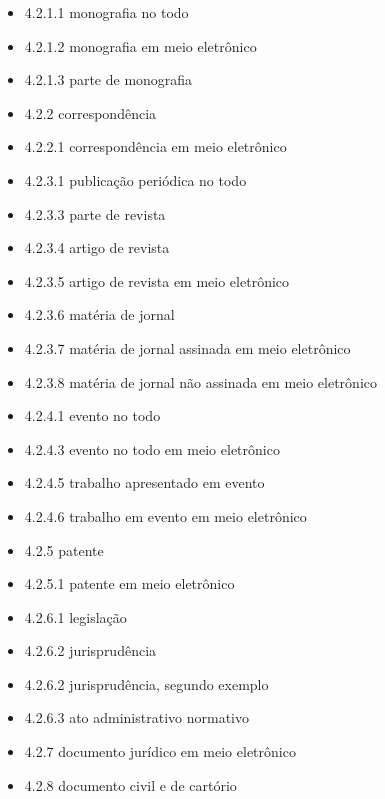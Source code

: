 \documentclass[dsc,pdfa,coorientador,dadoscoleta]{ufrj}
\begin{document}
  \begin{itemize}
    \item 4.2.1.1 monografia no todo \citep{m-4211,pt-4211}
    \item 4.2.1.2 monografia em meio eletrônico \citep{m-4212,pt-4212}
    \item 4.2.1.3 parte de monografia \citep{m-4213,pt-4213}
    \item 4.2.2 correspondência \citep{m-422,pt-422}
    \item 4.2.2.1 correspondência em meio eletrônico \citep{m-4221,pt-4221}
    \item 4.2.3.1 publicação periódica no todo \citep{m-4231,pt-4231}
    \item 4.2.3.3 parte de revista \citep{m-4233,pt-4233}
    \item 4.2.3.4 artigo de revista \citep{m-4234,pt-4234}
    \item 4.2.3.5 artigo de revista em meio eletrônico \citep{m-4235,pt-4235}
    \item 4.2.3.6 matéria de jornal \citep{m-4236,pt-4236}
    \item 4.2.3.7 matéria de jornal assinada em meio eletrônico \citep{m-4237,pt-4237}
    \item 4.2.3.8 matéria de jornal não assinada em meio eletrônico \citep{m-4238,pt-4238}
    \item 4.2.4.1 evento no todo \citep{m-4241,pt-4241}
    \item 4.2.4.3 evento no todo em meio eletrônico \citep{m-4243,pt-4243}
    \item 4.2.4.5 trabalho apresentado em evento \citep{m-4245,pt-4245}
    \item 4.2.4.6 trabalho em evento em meio eletrônico \citep{m-4246,pt-4246}
    \item 4.2.5 patente \citep{m-425,pt-425}
    \item 4.2.5.1 patente em meio eletrônico \citep{m-4251,pt-4251}
    \item 4.2.6.1 legislação \citep{m-4261,pt-4261}
    \item 4.2.6.2 jurisprudência \citep{m-4262,pt-4262}
    \item 4.2.6.2 jurisprudência, segundo exemplo \citep{m-4262b,pt-4262b}
    \item 4.2.6.3 ato administrativo normativo \citep{m-4263,pt-4263}
    \item 4.2.7 documento jurídico em meio eletrônico \citep{m-427,pt-427}
    \item 4.2.8 documento civil e de cartório \citep{m-428,pt-428}

\end{itemize}
\end{document}
